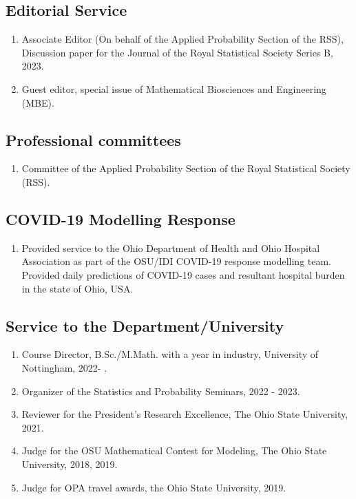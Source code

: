 \documentclass[11pt,a4paper,sans]{moderncv}        %
\begin{document}
\subsection{Editorial Service}
\begin{enumerate}
	\item Associate Editor (On behalf of the Applied Probability Section of the RSS), Discussion paper for the Journal of the Royal Statistical Society Series B, 2023. 
	\item Guest editor, special issue of Mathematical Biosciences and Engineering (MBE). 
\end{enumerate}

\subsection{Professional committees}
\begin{enumerate}
	\item Committee of the Applied Probability Section of the Royal Statistical Society (RSS). 
\end{enumerate}

\subsection{COVID-19 Modelling Response}
\begin{enumerate}
	\item Provided service to the Ohio Department of Health and Ohio Hospital Association as part of the OSU/IDI COVID-19 response modelling team. Provided daily predictions of COVID-19 cases and resultant hospital burden in the state of Ohio, USA. 
\end{enumerate}

\subsection{Service to the Department/University}
\begin{enumerate}
	\item Course Director, B.Sc./M.Math. with a year in industry, University of Nottingham, 2022- . 
	\item Organizer of the Statistics and Probability Seminars, 2022 - 2023.
	\item Reviewer for the President’s Research Excellence, The Ohio State University, 2021.
	\item {Judge for the OSU Mathematical Contest for Modeling, The Ohio State University,  2018, 2019}.
	\item {Judge for OPA travel awards, the Ohio State University, 2019}.
\end{enumerate}
\end{document}
